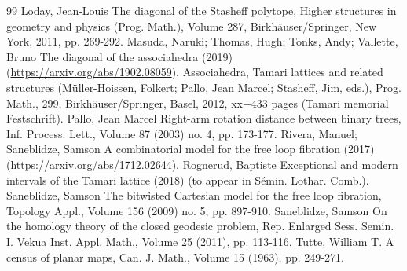 \begin{thebibliography}{99}
 Loday, Jean-Louis The diagonal of the Stasheff polytope, Higher structures in geometry and physics (Prog. Math.), Volume 287, Birkhäuser/Springer, New York, 2011, pp. 269-292.
 Masuda, Naruki; Thomas, Hugh; Tonks, Andy; Vallette, Bruno The diagonal of the associahedra (2019) (\url{https://arxiv.org/abs/1902.08059}).
 Associahedra, Tamari lattices and related structures (Müller-Hoissen, Folkert; Pallo, Jean Marcel; Stasheff, Jim, eds.), Prog. Math., 299, Birkhäuser/Springer, Basel, 2012, xx+433 pages (Tamari memorial Festschrift).
 Pallo, Jean Marcel Right-arm rotation distance between binary trees, Inf. Process. Lett., Volume 87 (2003) no. 4, pp. 173-177.
 Rivera, Manuel; Saneblidze, Samson A combinatorial model for the free loop fibration (2017) (\url{https://arxiv.org/abs/1712.02644}).
 Rognerud, Baptiste Exceptional and modern intervals of the Tamari lattice (2018) (to appear in Sémin. Lothar. Comb.).
 Saneblidze, Samson The bitwisted Cartesian model for the free loop fibration, Topology Appl., Volume 156 (2009) no. 5, pp. 897-910.
 Saneblidze, Samson On the homology theory of the closed geodesic problem, Rep. Enlarged Sess. Semin. I. Vekua Inst. Appl. Math., Volume 25 (2011), pp. 113-116.
 Tutte, William T. A census of planar maps, Can. J. Math., Volume 15 (1963), pp. 249-271.
\end{thebibliography}
